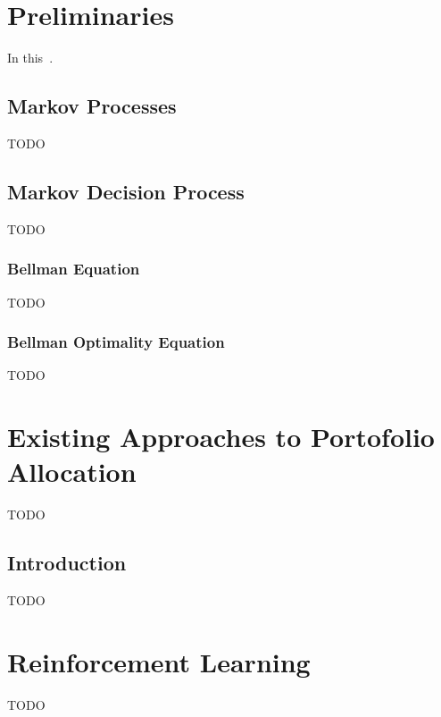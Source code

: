 

\chapter{Preliminaries}
In this~\cite{Knuth}.


\section{Markov Processes}
TODO


\section{Markov Decision Process}
TODO

\subsection{Bellman Equation}
TODO

\subsection{Bellman Optimality Equation}
TODO



\chapter{Existing Approaches to Portofolio Allocation}
TODO


\section{Introduction}
TODO




\chapter{Reinforcement Learning}
TODO


